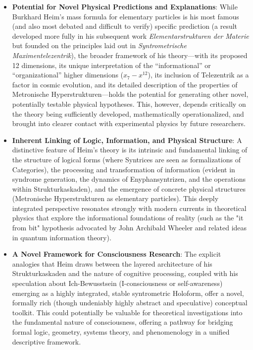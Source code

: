 \documentclass[12pt]{article}
\newcommand{\q}[1]{\enquote{#1}}
\begin{document}
\begin{itemize}
    \item \textbf{Potential for Novel Physical Predictions and Explanations}: While Burkhard Heim's mass formula for elementary particles is his most famous (and also most debated and difficult to verify) specific prediction (a result developed more fully in his subsequent work \textit{Elementarstrukturen der Materie} but founded on the principles laid out in \textit{Syntrometrische Maximentelezentrik}), the broader framework of his theory—with its proposed 12 dimensions, its unique interpretation of the \enquote{informational} or \q{organizational} higher dimensions (\( x_7-x^{12} \)), its inclusion of Telezentrik as a factor in cosmic evolution, and its detailed description of the properties of Metronische Hyperstrukturen—holds the potential for generating other novel, potentially testable physical hypotheses. This, however, depends critically on the theory being sufficiently developed, mathematically operationalized, and brought into clearer contact with experimental physics by future researchers.
    \item \textbf{Inherent Linking of Logic, Information, and Physical Structure}: A distinctive feature of Heim’s theory is its intrinsic and fundamental linking of the structure of logical forms (where Syntrices are seen as formalizations of Categories), the processing and transformation of information (evident in syndrome generation, the dynamics of Enyphansyntrizen, and the operations within Strukturkaskaden), and the emergence of concrete physical structures (Metronische Hyperstrukturen as elementary particles). This deeply integrated perspective resonates strongly with modern currents in theoretical physics that explore the informational foundations of reality (such as the "it from bit" hypothesis advocated by John Archibald Wheeler and related ideas in quantum information theory).
    \item \textbf{A Novel Framework for Consciousness Research}: The explicit analogies that Heim draws between the layered architecture of his Strukturkaskaden and the nature of cognitive processing, coupled with his speculation about Ich-Bewusstsein (I-consciousness or self-awareness) emerging as a highly integrated, stable syntrometric Holoform, offer a novel, formally rich (though undeniably highly abstract and speculative) conceptual toolkit. This could potentially be valuable for theoretical investigations into the fundamental nature of consciousness, offering a pathway for bridging formal logic, geometry, systems theory, and phenomenology in a unified descriptive framework.
\end{itemize}
\end{document}
